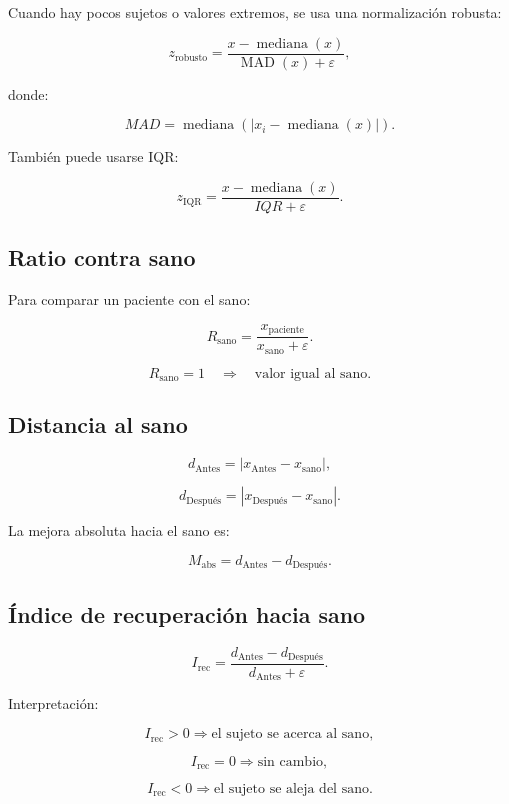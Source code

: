 \documentclass[12pt,a4paper]{article}
\begin{document}
Cuando hay pocos sujetos o valores extremos, se usa una normalización robusta:

\[
z_{\text{robusto}}
=
\frac{x-\operatorname{mediana}(x)}
{\operatorname{MAD}(x)+\varepsilon},
\]

donde:

\[
MAD =
\operatorname{mediana}
\left(
|x_i-\operatorname{mediana}(x)|
\right).
\]

También puede usarse IQR:

\[
z_{\text{IQR}}
=
\frac{x-\operatorname{mediana}(x)}
{IQR+\varepsilon}.
\]

\subsection{Ratio contra sano}

Para comparar un paciente con el sano:

\[
R_{\text{sano}}
=
\frac{x_{\text{paciente}}}
{x_{\text{sano}}+\varepsilon}.
\]

\[
R_{\text{sano}}=1
\quad\Rightarrow\quad
\text{valor igual al sano}.
\]

\subsection{Distancia al sano}

\[
d_{\text{Antes}}
=
|x_{\text{Antes}}-x_{\text{sano}}|,
\]

\[
d_{\text{Después}}
=
|x_{\text{Después}}-x_{\text{sano}}|.
\]

La mejora absoluta hacia el sano es:

\[
M_{\text{abs}}
=
d_{\text{Antes}}-d_{\text{Después}}.
\]

\subsection{Índice de recuperación hacia sano}

\[
I_{\text{rec}}
=
\frac{d_{\text{Antes}}-d_{\text{Después}}}
{d_{\text{Antes}}+\varepsilon}.
\]

Interpretación:

\[
I_{\text{rec}}>0
\Rightarrow
\text{el sujeto se acerca al sano},
\]

\[
I_{\text{rec}}=0
\Rightarrow
\text{sin cambio},
\]

\[
I_{\text{rec}}<0
\Rightarrow
\text{el sujeto se aleja del sano}.
\]

\end{document}
